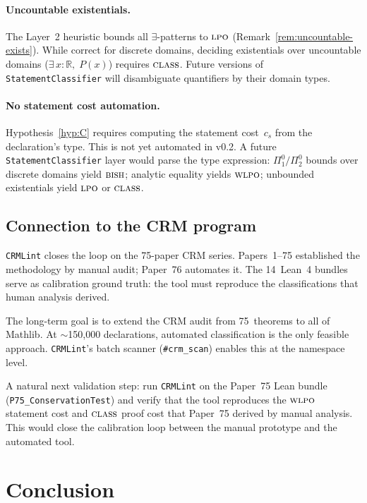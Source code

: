 \documentclass[12pt, a4paper]{article}
\theoremstyle{plain}
\theoremstyle{definition}
\theoremstyle{remark}
\newcommand{\BISH}{\textsc{bish}}
\newcommand{\WLPO}{\textsc{wlpo}}
\newcommand{\LPO}{\textsc{lpo}}
\newcommand{\CLASS}{\textsc{class}}
\newcommand{\CRMLint}{\texttt{CRMLint}}
\begin{document}
\paragraph{Uncountable existentials.}
The Layer~2 heuristic bounds all $\exists$-patterns to $\LPO$
(Remark~\ref{rem:uncountable-exists}).  While correct for discrete
domains, deciding existentials over uncountable domains
($\exists\,x : \mathbb{R},\;P(x)$) requires $\CLASS$.  Future
versions of \texttt{StatementClassifier} will disambiguate
quantifiers by their domain types.

\paragraph{No statement cost automation.}
Hypothesis~\ref{hyp:C} requires computing the statement cost~$c_s$
from the declaration's type.  This is not yet automated in v0.2.
A future \texttt{StatementClassifier} layer would parse the type
expression: $\Pi_1^0/\Pi_2^0$ bounds over discrete domains yield
$\BISH$; analytic equality yields $\WLPO$; unbounded existentials
yield $\LPO$ or $\CLASS$.

\subsection{Connection to the CRM program}

\CRMLint{} closes the loop on the 75-paper CRM series.
Papers~1--75 established the methodology by manual audit;
Paper~76 automates it.  The 14~Lean~4 bundles serve as
calibration ground truth: the tool must reproduce the
classifications that human analysis derived.

The long-term goal is to extend the CRM audit from 75~theorems
to all of Mathlib.  At $\sim$150,000 declarations, automated
classification is the only feasible approach.  \CRMLint's batch
scanner (\texttt{\#crm\_scan}) enables this at the namespace level.

A natural next validation step: run \CRMLint{} on the Paper~75
Lean bundle (\texttt{P75\_ConservationTest}) and verify that the
tool reproduces the $\WLPO$ statement cost and $\CLASS$ proof
cost that Paper~75 derived by manual analysis.  This would close
the calibration loop between the manual prototype and the
automated tool.


\section{Conclusion}\label{sec:conclusion}
\end{document}
